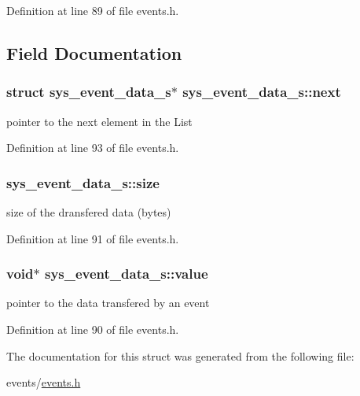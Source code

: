 Definition at line 89 of file events.\+h.



\subsection{Field Documentation}
\hypertarget{structsys__event__data__s_aa6f72c940fd46fc646876fe4271040a8}{}
\subsubsection[{next}]{\setlength{\rightskip}{0pt plus 5cm}struct {\bf sys\+\_\+event\+\_\+data\+\_\+s}$\ast$ sys\+\_\+event\+\_\+data\+\_\+s\+::next}\label{structsys__event__data__s_aa6f72c940fd46fc646876fe4271040a8}
pointer to the next element in the List 

Definition at line 93 of file events.\+h.

\hypertarget{structsys__event__data__s_a61e4846d66a617a9e5ed3602a3be63ef}{}
\subsubsection[{size}]{ sys\+\_\+event\+\_\+data\+\_\+s\+::size}\label{structsys__event__data__s_a61e4846d66a617a9e5ed3602a3be63ef}
size of the dransfered data (bytes) 

Definition at line 91 of file events.\+h.

\hypertarget{structsys__event__data__s_a72c5ebbbee4b4509abcfb926d23f294f}{}
\subsubsection[{value}]{\setlength{\rightskip}{0pt plus 5cm}void$\ast$ sys\+\_\+event\+\_\+data\+\_\+s\+::value}\label{structsys__event__data__s_a72c5ebbbee4b4509abcfb926d23f294f}
pointer to the data transfered by an event 

Definition at line 90 of file events.\+h.



The documentation for this struct was generated from the following file\+:\begin{DoxyCompactItemize}
\item 
events/\hyperlink{events_8h}{events.\+h}\end{DoxyCompactItemize}
